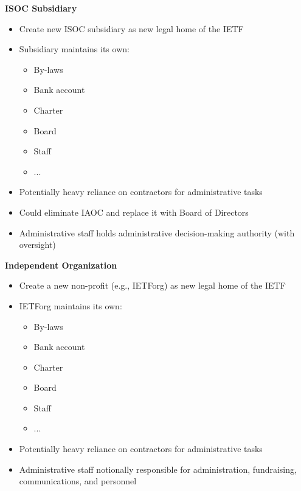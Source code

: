 \documentclass[helvetica]{seminar}
\newcommand{\heading}[1]{%
  \begin{center} 
    \large\bf 
    #1 
  \end{center} 
  \vspace{.4 in}}
\begin{document}
\begin{slide}

\heading{ISOC Subsidiary}

\begin{itemize}
\item Create new ISOC subsidiary as new legal home of the IETF
\item Subsidiary maintains its own:
{\footnotesize
\begin{itemize}
\item By-laws
\item Bank account
\item Charter
\item Board
\item Staff
\item ...
\end{itemize}
}
\item Potentially heavy reliance on contractors for administrative tasks
\item Could eliminate IAOC and replace it with Board of Directors
\item Administrative staff holds administrative decision-making authority (with oversight)
\end{itemize}

\end{slide}

\begin{slide}

\heading{Independent Organization}

\begin{itemize}
\item Create a new non-profit (e.g., IETForg) as new legal home of the IETF
\item IETForg maintains its own:
{\footnotesize
\begin{itemize}
\item By-laws
\item Bank account
\item Charter
\item Board
\item Staff
\item ...
\end{itemize}
}
\item Potentially heavy reliance on contractors for administrative tasks
\item Administrative staff notionally responsible for administration, fundraising, communications, and personnel
\end{itemize}

\end{slide}
\end{document}
